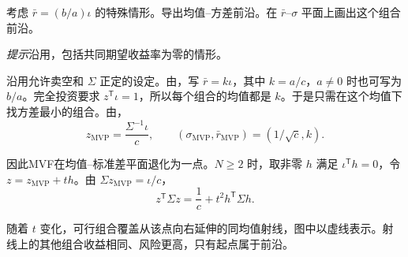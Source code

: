 \par\noindent\begin{minipage}{\linewidth}
\begin{problem}
 考虑 $\bar{r}=(b/a)\iota$ 的特殊情形。导出均值--方差前沿。在 $\bar{r}$--$\sigma$ 平面上画出这个组合前沿。
\par\textit{提示}\quad 沿用，包括共同期望收益率为零的情形。
\end{problem}
\end{minipage}\par
{}
\begin{solution}
沿用允许卖空和 $\Sigma$ 正定的设定。由，写 $\bar r=k\iota$，其中 $k=a/c$，$a\ne0$ 时也可写为 $b/a$。完全投资要求 $z^{\mathsf T}\iota=1$，所以每个组合的均值都是 $k$。于是只需在这个均值下找方差最小的组合。由，
\[
 z_{\mathrm{MVP}}=\frac{\Sigma^{-1}\iota}{c},\qquad
 (\sigma_{\mathrm{MVP}},\bar r_{\mathrm{MVP}})=(1/\sqrt c,k).
\]

因此MVF在均值--标准差平面退化为一点。$N\ge2$ 时，取非零 $h$ 满足 $\iota^{\mathsf T}h=0$，令 $z=z_{\mathrm{MVP}}+th$。由 $\Sigma z_{\mathrm{MVP}}=\iota/c$，
\[
 z^{\mathsf T}\Sigma z=\frac1c+t^2h^{\mathsf T}\Sigma h.
\]

随着 $t$ 变化，可行组合覆盖从该点向右延伸的同均值射线，图中以虚线表示。射线上的其他组合收益相同、风险更高，只有起点属于前沿。
\begin{center}
\end{center}
\end{solution}

